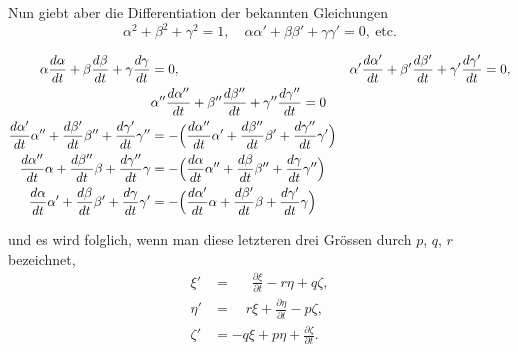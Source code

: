 \documentclass[12pt,a4paper]{article}
\begin{document}
Nun giebt aber die Differentiation der bekannten Gleichungen
\[
\alpha^2 + \beta^2 + \gamma^2 = 1,\quad \alpha\alpha' + \beta\beta' + \gamma\gamma' = 0,\ \text{etc.}
\]

\newpage

\begin{align*}
\alpha\frac{d\alpha}{dt} + \beta\frac{d\beta}{dt} + \gamma\frac{d\gamma}{dt} &= 0, &
\alpha'\frac{d\alpha'}{dt} + \beta'\frac{d\beta'}{dt} + \gamma'\frac{d\gamma'}{dt} &= 0,\\
&\alpha''\frac{d\alpha''}{dt} + \beta''\frac{d\beta''}{dt} + \gamma''\frac{d\gamma''}{dt} = 0 &\\
\frac{d\alpha'}{dt}\alpha'' + \frac{d\beta'}{dt}\beta'' + \frac{d\gamma'}{dt}\gamma'' &= -\Bigl(\frac{d\alpha''}{dt}\alpha' + \frac{d\beta''}{dt}\beta' + \frac{d\gamma''}{dt}\gamma'\Bigr) &\\
\frac{d\alpha''}{dt}\alpha + \frac{d\beta''}{dt}\beta + \frac{d\gamma''}{dt}\gamma &= -\Bigl(\frac{d\alpha}{dt}\alpha'' + \frac{d\beta}{dt}\beta'' + \frac{d\gamma}{dt}\gamma''\Bigr) &\\
\frac{d\alpha}{dt}\alpha' + \frac{d\beta}{dt}\beta' + \frac{d\gamma}{dt}\gamma' &= -\Bigl(\frac{d\alpha'}{dt}\alpha + \frac{d\beta'}{dt}\beta + \frac{d\gamma'}{dt}\gamma\Bigr) &
\end{align*}

\begin{equation}
\tag{3}
\end{equation}
und es wird folglich, wenn man diese letzteren drei Grössen durch $p$, $q$, $r$ bezeichnet,
\begin{equation}
\tag{4}
\begin{aligned}
\xi' &= \quad\ \ \frac{\partial \xi}{\partial t} - r\eta + q\zeta,\\
\eta' &= \quad r\xi + \frac{\partial \eta}{\partial t} - p\zeta,\\
\zeta' &= -q\xi + p\eta + \frac{\partial \zeta}{\partial t}.
\end{aligned}
\end{equation}
\end{document}
